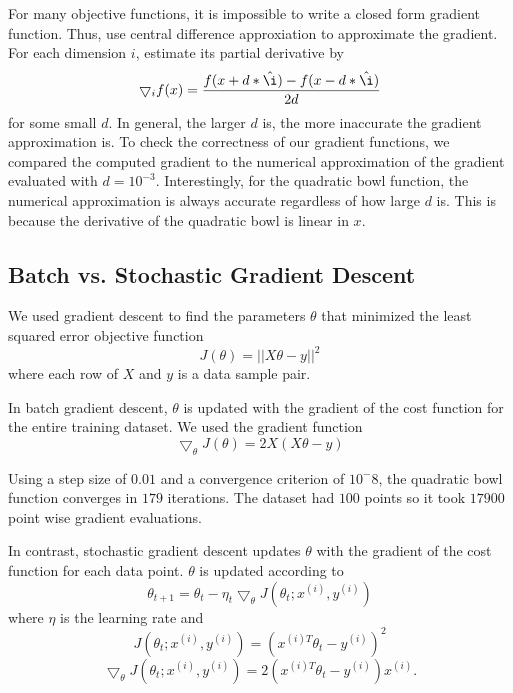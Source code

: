 \documentclass[a4paper,twoside]{article}
\begin{document}
For many objective functions, it is impossible to write a closed form gradient function. Thus, use central difference approxiation to approximate the gradient. For each dimension $i$, estimate its partial derivative by 
\begin{equation}
\bigtriangledown_i f(x) = \frac{f(x+d*\hat{\i}) - f(x-d*\hat{\i})}{2d}
\end{equation}
for some small $d$. In general, the larger $d$ is, the more inaccurate the gradient approximation is. To check the correctness of our gradient functions, we compared the computed gradient to the numerical approximation of the gradient evaluated with $d=10^{-3}$. Interestingly, for the quadratic bowl function, the numerical approximation is always accurate regardless of how large $d$ is. This is because the derivative of the quadratic bowl is linear in $x$.

\subsection{Batch vs. Stochastic Gradient Descent}
We used gradient descent to find the parameters $\theta$ that minimized the least squared error objective function
\begin{equation}
J(\theta) = ||X\theta - y||^2
\end{equation}
where each row of $X$ and $y$ is a data sample pair. 

In batch gradient descent, $\theta$ is updated with the gradient of the cost function for the entire training dataset.
We used the gradient function
\begin{equation}
\bigtriangledown_\theta J(\theta) = 2X(X\theta - y)
\end{equation}

Using a step size of $0.01$ and a convergence criterion of $10^-8$, the quadratic bowl function converges in $179$ iterations. The dataset had $100$ points so it took $17900$ point wise gradient evaluations.

In contrast, stochastic gradient descent updates $\theta$ with the gradient of the cost function for each data point. $\theta$ is updated according to 
\begin{equation}
\theta_{t+1} = \theta_t - \eta_t \bigtriangledown_\theta J(\theta_t; x^{(i)}, y^{(i)})
\end{equation}
where $\eta$ is the learning rate and
\begin{equation}
J(\theta_t; x^{(i)}, y^{(i)}) = (x^{(i)T} \theta_t - y^{(i)})^2
\end{equation}
\begin{equation}
\bigtriangledown_\theta J(\theta_t; x^{(i)}, y^{(i)}) = 2(x^{(i)T} \theta_t - y^{(i)}) x^{(i)}.
\end{equation}
\end{document}
